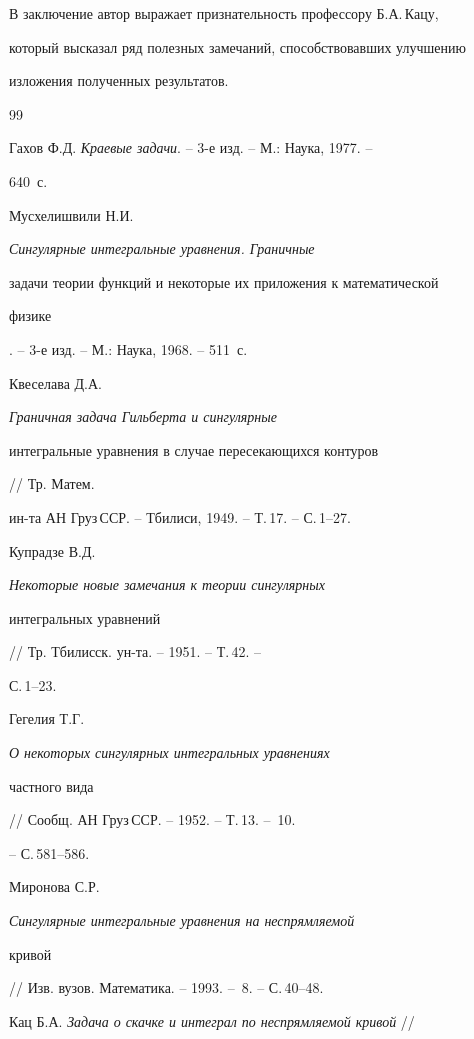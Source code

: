 В заключение автор выражает признательность профессору Б.А.\,Кацу,


который высказал ряд полезных замечаний, способствовавших улучшению


изложения полученных результатов.








\begin{thebibliography}{99}







Гахов Ф.Д. {\em Краевые задачи}. -- 3-е изд. -- М.: Наука, 1977. --


640~с.




Мусхелишвили Н.И. {\em Сингулярные интегральные уравнения. Граничные


задачи теории функций и некоторые их приложения к математической


физике}. -- 3-е изд. -- М.: Наука, 1968. -- 511~с.




Квеселава Д.А. {\em Граничная задача Гильберта и сингулярные


интегральные уравнения в случае пересекающихся контуров} // Тр. Матем.


ин-та АН Груз\,ССР. -- Тбилиси, 1949. -- Т.\,17. -- С.\,1--27.




Купрадзе В.Д. {\em Некоторые новые замечания к теории сингулярных


интегральных уравнений} // Тр. Тбилисск. ун-та. -- 1951. -- Т.\,42. --


С.\,1--23.




Гегелия Т.Г. {\em О некоторых сингулярных интегральных уравнениях


частного вида} // Сообщ. АН Груз\,ССР. -- 1952. -- Т.\,13. -- \No\,10.


-- С.\,581--586.




Миронова С.Р. {\em Сингулярные интегральные уравнения на неспрямляемой


кривой} // Изв. вузов. Математика. -- 1993. -- \No\,8. -- С.\,40--48.




Кац Б.А. {\em Задача о скачке и интеграл по неспрямляемой кривой} //



\end{thebibliography}
